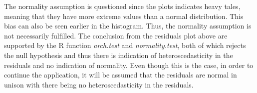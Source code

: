 \noindent The normality assumption is questioned since the plots indicates heavy tales, meaning that they have more extreme values than a normal distribution. This bias can also be seen earlier in the histogram. Thus, the normality assumption is not necessarily fulfilled. The conclusion from the residuals plot above are supported by the R function \textit{arch.test} and \textit{normality.test}, both of which rejects the null hypothesis and thus there is indication of heteroscedasticity in the residuals and no indication of normality. Even though this is the case, in order to continue the application, it will be assumed that the residuals are normal in unison with there being no heteroscedasticity in the residuals.
